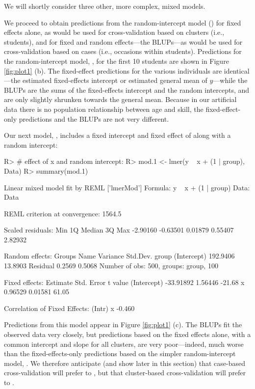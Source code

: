 \documentclass[
]{jss}
\begin{document}
We will shortly consider three other, more complex, mixed models.

We proceed to obtain predictions from the random-intercept model
() for fixed effects alone, as would be used for
cross-validation based on clusters (i.e., students), and for fixed and
random effects---the BLUPs---as would be used for cross-validation based
on cases (i.e., occasions within students). Predictions for the
random-intercept model, , for the first 10 students are
shown in Figure \ref{fig:plot1} (b). The fixed-effect predictions for
the various individuals are identical---the estimated fixed-effects
intercept or estimated general mean of \(y\)---while the BLUPs are the
sums of the fixed-effects intercept and the random intercepts, and are
only slightly shrunken towards the general mean. Because in our
artificial data there is no population relationship between age and
skill, the fixed-effect-only predictions and the BLUPs are not very
different.

Our next model, , includes a fixed intercept and fixed
effect of  along with a random intercept:

\begin{CodeChunk}
\begin{CodeInput}
R> # effect of x and random intercept:
R> mod.1 <- lmer(y ~ x + (1 | group), Data)
R> summary(mod.1)
\end{CodeInput}
\begin{CodeOutput}
Linear mixed model fit by REML ['lmerMod']
Formula: y ~ x + (1 | group)
   Data: Data

REML criterion at convergence: 1564.5

Scaled residuals: 
     Min       1Q   Median       3Q      Max 
-2.90160 -0.63501  0.01879  0.55407  2.82932 

Random effects:
 Groups   Name        Variance Std.Dev.
 group    (Intercept) 192.9406 13.8903 
 Residual               0.2569  0.5068 
Number of obs: 500, groups:  group, 100

Fixed effects:
             Estimate Std. Error t value
(Intercept) -33.91892    1.56446  -21.68
x             0.96529    0.01581   61.05

Correlation of Fixed Effects:
  (Intr)
x -0.460
\end{CodeOutput}
\end{CodeChunk}

Predictions from this model appear in Figure \ref{fig:plot1} (c). The
BLUPs fit the observed data very closely, but predictions based on the
fixed effects alone, with a common intercept and slope for all clusters,
are very poor---indeed, much worse than the fixed-effects-only
predictions based on the simpler random-intercept model, .
We therefore anticipate (and show later in this section) that case-based
cross-validation will prefer  to , but that
cluster-based cross-validation will prefer  to .
\end{document}
